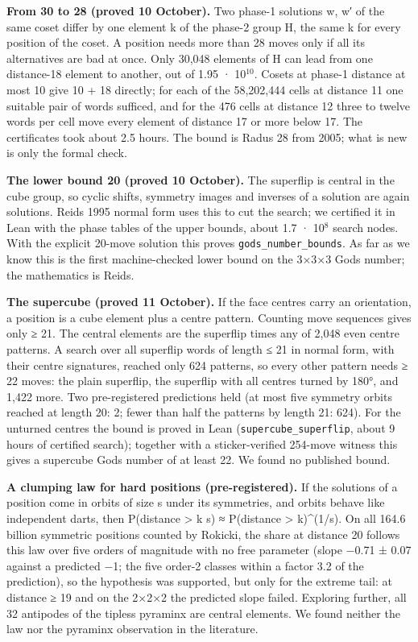 \documentclass[11pt,a4paper]{article}
\begin{document}
\textbf{From 30 to 28 (proved 10 October).} Two phase-1 solutions w, w′ of the same coset differ by one element k of the phase-2 group H, the same k for every position of the coset. A position needs more than 28 moves only if all its alternatives are bad at once. Only 30,048 elements of H can lead from one distance-18 element to another, out of 1.95 · 10\(^{10}\). Cosets at phase-1 distance at most 10 give 10 + 18 directly; for each of the 58,202,444 cells at distance 11 one suitable pair of words sufficed, and for the 476 cells at distance 12 three to twelve words per cell move every element of distance 17 or more below 17. The certificates took about 2.5 hours. The bound is Radu\textquotesingle s 28 from 2005; what is new is only the formal check.

\textbf{The lower bound 20 (proved 10 October).} The superflip is central in the cube group, so cyclic shifts, symmetry images and inverses of a solution are again solutions. Reid\textquotesingle s 1995 normal form uses this to cut the search; we certified it in Lean with the phase tables of the upper bounds, about 1.7 · 10\(^{8}\) search nodes. With the explicit 20-move solution this proves \texttt{gods\_\allowbreak{}number\_\allowbreak{}bounds}. As far as we know this is the first machine-checked lower bound on the 3×3×3 God\textquotesingle s number; the mathematics is Reid\textquotesingle s.

\textbf{The supercube (proved 11 October).} If the face centres carry an orientation, a position is a cube element plus a centre pattern. Counting move sequences gives only ≥ 21. The central elements are the superflip times any of 2,048 even centre patterns. A search over all superflip words of length ≤ 21 in normal form, with their centre signatures, reached only 624 patterns, so every other pattern needs ≥ 22 moves: the plain superflip, the superflip with all centres turned by 180°, and 1,422 more. Two pre-registered predictions held (at most five symmetry orbits reached at length 20: 2; fewer than half the patterns by length 21: 624). For the unturned centres the bound is proved in Lean (\texttt{supercube\_\allowbreak{}superflip}, about 9 hours of certified search); together with a sticker-verified 254-move witness this gives a supercube God\textquotesingle s number of at least 22. We found no published bound.

\textbf{A clumping law for hard positions (pre-registered).} If the solutions of a position come in orbits of size s under its symmetries, and orbits behave like independent darts, then P(distance \textgreater{} k \textbar{} s) ≈ P(distance \textgreater{} k)\^{}(1/s). On all 164.6 billion symmetric positions counted by Rokicki, the share at distance 20 follows this law over five orders of magnitude with no free parameter (slope −0.71 ± 0.07 against a predicted −1; the five order-2 classes within a factor 3.2 of the prediction), so the hypothesis was supported, but only for the extreme tail: at distance ≥ 19 and on the 2×2×2 the predicted slope failed. Exploring further, all 32 antipodes of the tipless pyraminx are central elements. We found neither the law nor the pyraminx observation in the literature.
\end{document}

